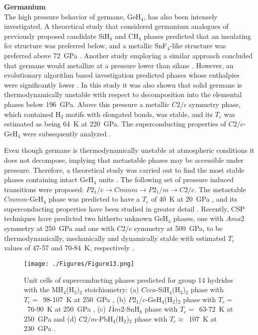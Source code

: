 \documentclass[12pt,letterpaper,oneside]{article}
\begin{document}
\noindent\textbf{Germanium} \\ 
%
The high pressure behavior of germane, GeH$_4$, has also been intensely investigated. A theoretical study that considered germanium analogues of previously proposed candidate SiH$_4$ and CH$_4$ phases predicted that an insulating fcc structure was preferred below, and a metallic SnF$_4$-like structure was preferred above 72~GPa \cite{Canales:2006a}. Another study employing a similar approach concluded that germane would metallize at a pressure lower than silane \cite{Li:2007-Ge}. However, an evolutionary algorithm based investigation predicted phases whose enthalpies were significantly lower \cite{Gao:2008a}. In this study it was also shown that solid germane is thermodynamically unstable with respect to decomposition into the elemental phases below 196~GPa. Above this pressure a metallic $C2/c$ symmetry phase, which contained H$_2$ motifs with elongated bonds, was stable, and its $T_c$ was estimated as being 64~K at 220~GPa. The superconducting properties of $C2/c$-GeH$_4$ were subsequently analyzed  \cite{Szczesniak:2015-Ge}. 

Even though germane is thermodynamically unstable at atmospheric conditions it does not decompose, implying that  metastable phases may be accessible under pressure. Therefore, a theoretical study was carried out to find the most stable phases containing intact GeH$_4$ units \cite{Zhang:2010-Ge}. The following set of pressure induced transitions were proposed: $P2_1/c\rightarrow Cmmm \rightarrow P2_1/m \rightarrow C2/c$. The metastable $Cmmm$-GeH$_4$ phase was predicted to have a $T_c$ of 40~K at 20~GPa \cite{Zhang:2010-2-Ge}, and its superconducting properties have been studied in greater detail \cite{Szczkesniak:2013-Ge}. Recently, CSP techniques have predicted two hitherto unknown GeH$_4$ phases, one with $Ama2$ symmetry at 250~GPa and one with $C2/c$ symmetry at 500~GPa, to be thermodynamically, mechanically and dynamically stable with estimated $T_c$ values of 47-57 and 70-84~K, respectively \cite{Zhang:2015-Ge}. 


\begin{figure}[h!]
\begin{center}
\texttt{[image: ./Figures/Figure13.png]}
\end{center}
\caption{Unit cells of superconducting phases predicted for group 14 hydrides with the MH$_4$(H$_2$)$_2$ stoichiometry: (a) $Ccca$-SiH$_4$(H$_2$)$_2$ phase with $T_c=$~98-107~K at 250~GPa \cite{Li:2010-Si}, (b) $P2_{1}/c$-GeH$_4$(H$_2$)$_2$ phase with $T_c=$~76-90~K at 250~GPa \cite{Zhong:2012-Ge}, (c) $I\bar{4}m2$-SnH$_8$ phase with $T_c=$~63-72~K at 250~GPa \cite{Zhang:2015a} and (d) $C2/m$-PbH$_4$(H$_2$)$_2$ phase with $T_c\approx$~107~K at 230~GPa \cite{Cheng:2015}.}
\label{fig:Group14}
\end{figure}
\end{document}
